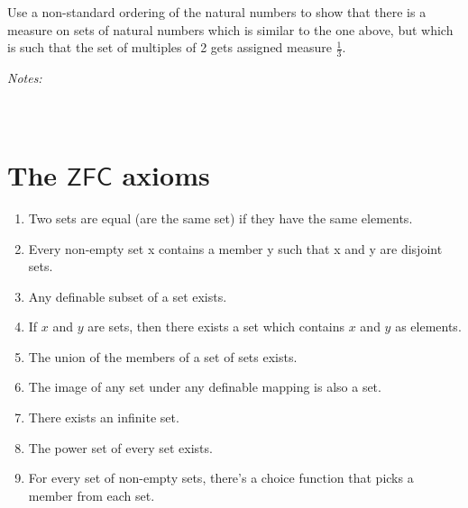 \documentclass[justified]{tufte-handout}
\newcommand{\bfw}{\begin{fullwidth}}
\newcommand{\efw}{\end{fullwidth}}
\begin{document}
\noindent\bfw Use a non-standard ordering of the natural numbers to show that there is a measure on sets of natural numbers which is similar to the one above, but which is such that the set of multiples of 2 gets assigned measure $\frac{1}{3}$.\efw

\noindent \emph{Notes:}  \underline{\hspace{15.4cm}}\\\\\underline{\hspace{16.43cm}}\\

\section{The $\mathsf{ZFC}$ axioms}


\begin{enumerate}
\item Two sets are equal (are the same set) if they have the same elements.
\item Every non-empty set x contains a member y such that x and y are disjoint sets.
\item Any definable subset of a set exists.
\item If $x$ and $y$ are sets, then there exists a set which contains $x$ and $y$ as elements.
\item The union of the members of a set of sets exists.
\item The image of any set under any definable mapping is also a set.
\item There exists an infinite set.
\item The power set of every set exists.
\item For every set of non-empty sets, there's a choice function that picks a member from each set.
\end{enumerate}
\end{document}
